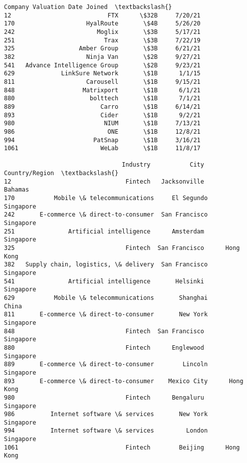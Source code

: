 \documentclass[11pt]{article}
\makeatletter
\newcommand{\boxspacing}{\kern\kvtcb@left@rule\kern\kvtcb@boxsep}
\newcommand{\prompt}[4]{
        \ttfamily\llap{{\color{#2}[#3]:\hspace{3pt}#4}}\vspace{-\baselineskip}
    }
\makeatother
\begin{document}
            \begin{tcolorbox}[breakable, size=fbox, boxrule=.5pt, pad at break*=1mm, opacityfill=0]
\prompt{Out}{outcolor}{18}{\boxspacing}
\begin{Verbatim}[commandchars=\\\{\}]
                         Company Valuation Date Joined  \textbackslash{}
12                           FTX      \$32B     7/20/21
170                    HyalRoute       \$4B     5/26/20
242                       Moglix       \$3B     5/17/21
251                         Trax       \$3B     7/22/19
325                  Amber Group       \$3B     6/21/21
382                    Ninja Van       \$2B     9/27/21
541   Advance Intelligence Group       \$2B     9/23/21
629             LinkSure Network       \$1B      1/1/15
811                    Carousell       \$1B     9/15/21
848                   Matrixport       \$1B      6/1/21
880                     bolttech       \$1B      7/1/21
889                        Carro       \$1B     6/14/21
893                        Cider       \$1B      9/2/21
980                         NIUM       \$1B     7/13/21
986                          ONE       \$1B     12/8/21
994                      PatSnap       \$1B     3/16/21
1061                       WeLab       \$1B     11/8/17

                                 Industry           City Country/Region  \textbackslash{}
12                                Fintech   Jacksonville        Bahamas
170           Mobile \& telecommunications     El Segundo      Singapore
242       E-commerce \& direct-to-consumer  San Francisco      Singapore
251               Artificial intelligence      Amsterdam      Singapore
325                               Fintech  San Francisco      Hong Kong
382   Supply chain, logistics, \& delivery  San Francisco      Singapore
541               Artificial intelligence       Helsinki      Singapore
629           Mobile \& telecommunications       Shanghai          China
811       E-commerce \& direct-to-consumer       New York      Singapore
848                               Fintech  San Francisco      Singapore
880                               Fintech      Englewood      Singapore
889       E-commerce \& direct-to-consumer        Lincoln      Singapore
893       E-commerce \& direct-to-consumer    Mexico City      Hong Kong
980                               Fintech      Bengaluru      Singapore
986          Internet software \& services       New York      Singapore
994          Internet software \& services         London      Singapore
1061                              Fintech        Beijing      Hong Kong


\end{Verbatim}
\end{tcolorbox}
\end{document}
